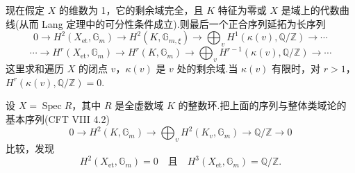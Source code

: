 现在假定 $X$ 的维数为 1，它的剩余域完全，且 $K$ 特征为零或 $X$ 是域上的代数曲线(从而 Lang 定理中的可分性条件成立).则最后一个正合序列延拓为长序列
\[
0 \to H^{2}(X_{\mathrm{et}}, \mathbb{G}_{m}) \to H^{2}(K, \mathbb{G}_{m, \xi}) \to \bigoplus_{v} H^{1}(\kappa(v), \mathbb{Q}/\mathbb{Z}) \to \cdots
\]
\[
\cdots \to H^{r}(X_{\mathrm{et}}, \mathbb{G}_{m}) \to H^{r}(K, \mathbb{G}_{m}) \to \bigoplus_{v} H^{r-1}(\kappa(v), \mathbb{Q}/\mathbb{Z}) \to \cdots
\]
这里求和遍历 $X$ 的闭点 $v$，$\kappa(v)$ 是 $v$ 处的剩余域.当 $\kappa(v)$ 有限时，对 $r > 1$，$H^{r}(\kappa(v), \mathbb{Q}/\mathbb{Z}) = 0$.

设 $X = \operatorname{Spec} R$，其中 $R$ 是全虚数域 $K$ 的整数环.把上面的序列与整体类域论的基本序列(CFT VIII 4.2)
\[
0 \to H^{2}(K, \mathbb{G}_{m}) \to \bigoplus_{v} H^{2}(K_v, \mathbb{G}_{m}) \to \mathbb{Q}/\mathbb{Z} \to 0
\]
比较，发现
\[
H^{2}(X_{\mathrm{et}}, \mathbb{G}_{m}) = 0 \quad \text{且} \quad H^{3}(X_{\mathrm{et}}, \mathbb{G}_{m}) = \mathbb{Q}/\mathbb{Z}.
\]
